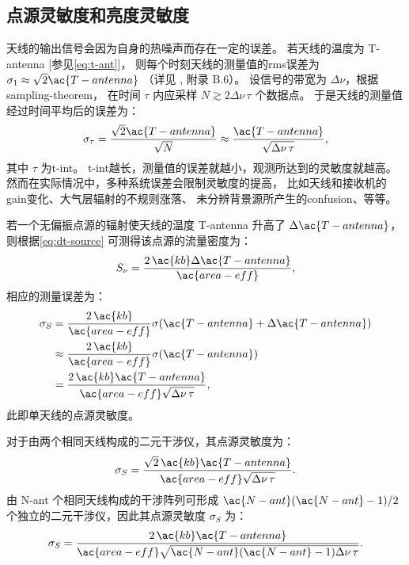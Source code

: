 \subsection{点源灵敏度和亮度灵敏度}

天线的输出信号会因为自身的热噪声而存在一定的误差。
若天线的温度为 \ac{T-antenna} [参见\autoref{eq:t-ant}]，
则每个时刻天线的测量值的\ac{rms}误差为
$\sigma_1 \approx \sqrt{2} \ac{T-antenna}$
（详见 , 附录 B.6）。
设信号的带宽为 $\Delta\nu$，根据\ac{sampling-theorem}，
在时间 $\tau$ 内应采样 $N \gtrsim 2 \Delta\nu \,\tau$ 个数据点。
于是天线的测量值经过时间平均后的误差为：
\begin{equation}
  \label{eq:radiometer}
  \sigma_{\tau}
    = \frac{\sqrt{2} \ac{T-antenna}}{\sqrt{N}}
    \approx \frac{\ac{T-antenna}}{\sqrt{\Delta\nu \,\tau}} ,
\end{equation}
其中 $\tau$ 为\ac{t-int}。
\ac{t-int}越长，测量值的误差就越小，观测所达到的灵敏度就越高。
然而在实际情况中，多种系统误差会限制灵敏度的提高，
比如天线和接收机的\ac{gain}变化、大气层辐射的不规则涨落、
未分辨背景源所产生的\ac{confusion}、等等。

若一个无偏振点源的辐射使天线的温度 \ac{T-antenna} 升高了 $\Delta\ac{T-antenna}$，
则根据\autoref{eq:dt-source} 可测得该点源的流量密度为：
\begin{equation}
  S_{\nu} = \frac{2\,\ac{kb} \Delta\ac{T-antenna}}{\ac{area-eff}} ,
\end{equation}
相应的测量误差为：
\begin{align}
  \sigma_S
    & = \frac{2\,\ac{kb}}{\ac{area-eff}}
        \sigma(\ac{T-antenna} + \Delta\ac{T-antenna}) \\
    & \approx \frac{2\,\ac{kb}}{\ac{area-eff}} \sigma(\ac{T-antenna}) \\
    & = \frac{2\,\ac{kb} \ac{T-antenna}}{
      \ac{area-eff} \sqrt{\Delta\nu \,\tau}} ,
\end{align}
此即单天线的点源灵敏度。

对于由两个相同天线构成的二元干涉仪，其点源灵敏度为：
\begin{equation}
  \sigma_S
    = \frac{\sqrt{2}\,\ac{kb} \ac{T-antenna}}{
        \ac{area-eff} \sqrt{\Delta\nu \,\tau}} .
\end{equation}
由 \ac{N-ant} 个相同天线构成的干涉阵列可形成 $\ac{N-ant}(\ac{N-ant}-1)/2$
个独立的二元干涉仪，因此其点源灵敏度 $\sigma_S$ 为：
\begin{equation}
  \label{eq:sigma-ps}
  \sigma_S
    = \frac{2\,\ac{kb} \ac{T-antenna}}{
        \ac{area-eff} \sqrt{\ac{N-ant}(\ac{N-ant}-1) \Delta\nu \,\tau}} .
\end{equation}

